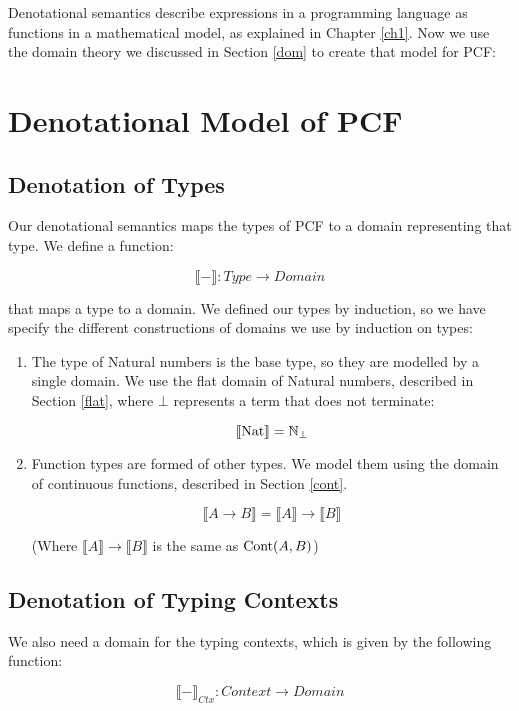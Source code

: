 Denotational semantics describe expressions in a programming language as functions in a mathematical model, as explained in Chapter \ref{ch1}. Now we use the domain theory we discussed in Section \ref{dom} to create that model for PCF:

\section{Denotational Model of PCF} 

\subsection{Denotation of Types}

Our denotational semantics maps the types of PCF to a domain representing that type. We define a function:

\[\llbracket - \rrbracket : Type \to Domain \]

that maps a type to a domain. We defined our types by induction, so we  have specify the different constructions of domains we use by induction on types:

\begin{enumerate}
\item{The type of Natural numbers is the base type, so they are modelled by a single domain. We use the flat domain of Natural numbers, described in Section \ref{flat}, where $\bot$ represents a term that does not terminate:

\[ \llbracket \operatorname{Nat} \rrbracket = \mathbb{N}_{\bot} \]

}
\item{Function types are formed of other types. We model them using the domain of continuous functions, described in Section \ref{cont}.

\[\llbracket A \to B \rrbracket = \llbracket A \rrbracket \to \llbracket B \rrbracket \]

(Where $\llbracket A \rrbracket \to \llbracket B \rrbracket$ is the same as $\operatorname{Cont}(A,B)$)}
\end{enumerate}

\subsection{Denotation of Typing Contexts}
We also need a domain for the typing contexts, which is given by the following function:

\[ \llbracket - \rrbracket_{Ctx} : Context \to Domain \]

